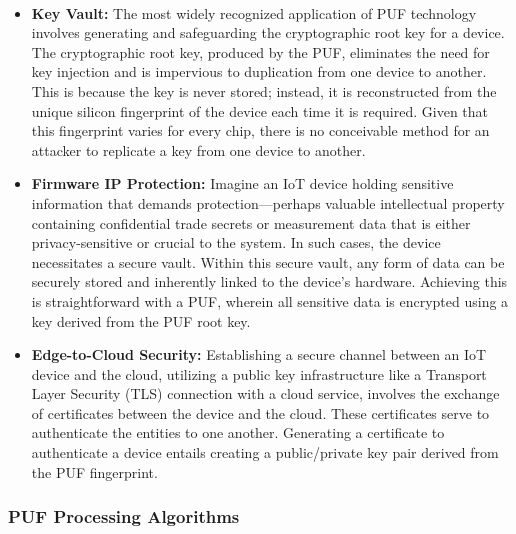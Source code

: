 \paragraph*{}
\begin{itemize}
	\item \textbf{Key Vault:} The most widely recognized application of PUF technology involves generating and safeguarding the cryptographic root key for a device. The cryptographic root key, produced by the PUF, eliminates the need for key injection and is impervious to duplication from one device to another. This is because the key is never stored; instead, it is reconstructed from the unique silicon fingerprint of the device each time it is required. Given that this fingerprint varies for every chip, there is no conceivable method for an attacker to replicate a key from one device to another.
	\item \textbf{Firmware IP Protection:} Imagine an IoT device holding sensitive information that demands protection—perhaps valuable intellectual property containing confidential trade secrets or measurement data that is either privacy-sensitive or crucial to the system. In such cases, the device necessitates a secure vault. Within this secure vault, any form of data can be securely stored and inherently linked to the device's hardware. Achieving this is straightforward with a PUF, wherein all sensitive data is encrypted using a key derived from the PUF root key.
	\item \textbf{Edge-to-Cloud Security:} Establishing a secure channel between an IoT device and the cloud, utilizing a public key infrastructure like a Transport Layer Security (TLS) connection with a cloud service, involves the exchange of certificates between the device and the cloud. These certificates serve to authenticate the entities to one another. Generating a certificate to authenticate a device entails creating a public/private key pair derived from the PUF fingerprint.
\end{itemize}
\subsubsection{PUF Processing Algorithms}
